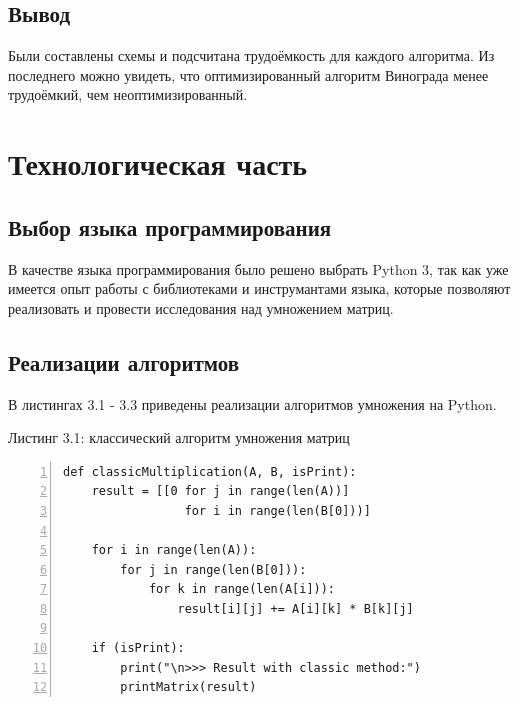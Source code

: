 \documentclass[12pt,a4paper]{report}
\begin{document}
\section{Вывод}

Были составлены схемы и подсчитана трудоёмкость для каждого алгоритма.
Из последнего можно увидеть, что оптимизированный алгоритм Винограда менее трудоёмкий, чем неоптимизированный. 

\newpage
\chapter{Технологическая часть}

\section{Выбор языка программирования}

В качестве языка программирования было решено выбрать Python 3, так как уже имеется опыт работы с 
библиотеками и инструмантами языка, которые позволяют реализовать и провести исследования над 
умножением матриц.

\section{Реализации алгоритмов}

В листингах 3.1 - 3.3 приведены реализации алгоритмов умножения на Python.

\textrm{Листинг 3.1: классический алгоритм умножения матриц}
\begin{lstlisting}[frame=single, numbers=left]
def classicMultiplication(A, B, isPrint):
    result = [[0 for j in range(len(A))] 
                 for i in range(len(B[0]))]

    for i in range(len(A)):
        for j in range(len(B[0])):
            for k in range(len(A[i])):
                result[i][j] += A[i][k] * B[k][j]
    
    if (isPrint):
        print("\n>>> Result with classic method:")
        printMatrix(result)
\end{lstlisting}
\end{document}
